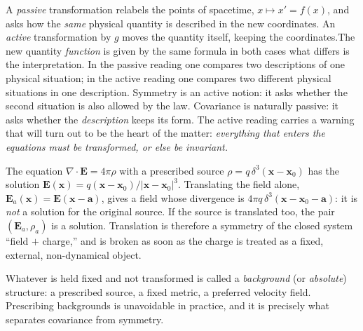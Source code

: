 A \emph{passive} transformation relabels the points of spacetime, $x\mapsto
x'=f(x)$, and asks how the \emph{same} physical quantity is described in the
new coordinates. An \emph{active} transformation by $g$ moves the quantity
itself, keeping the coordinates.The new quantity \emph{function} is given by
the same formula in both cases what differs is the interpretation. In the
passive reading one compares two descriptions of one physical situation; in the
active reading one compares two different physical situations in one
description. Symmetry is an active notion: it asks whether the second situation
is also allowed by the law. Covariance is naturally passive: it asks whether
the \emph{description} keeps its form. The active reading carries a warning
that will turn out to be the heart of the matter: \emph{everything that enters
the equations must be transformed, or else be invariant.}

\begin{example}
    \label{ex:coulomb} The equation
    $\nabla\!\cdot{\bm{E}}=4\pi\rho$ with a prescribed source
    $\rho=q\,\delta^3({\bm{x}}-{\bm{x}}_0)$ has the solution
    ${\bm{E}}({\bm{x}})=q({\bm{x}}-{\bm{x}}_0)/|{\bm{x}}-{\bm{x}}_0|^3$.
    Translating the field alone, ${\bm{E}}_a({\bm{x}})={\bm{E}}({\bm{x}}-\bm
    a)$, gives a field whose divergence is $4\pi
    q\,\delta^3({\bm{x}}-{\bm{x}}_0-\bm a)$: it is \emph{not} a solution for
    the original source. If the source is translated too, the pair
    $({\bm{E}}_a,\rho_a)$ is a solution. Translation is therefore a symmetry of
    the closed system ``field $+$ charge,'' and is broken as soon as the charge
    is treated as a fixed, external, non-dynamical object. 
\end{example}

Whatever is held fixed and not transformed is called a \emph{background} (or
\emph{absolute}) structure: a prescribed source, a fixed metric, a preferred
velocity field. Prescribing backgrounds is unavoidable in practice, and it is
precisely what separates covariance from symmetry.


